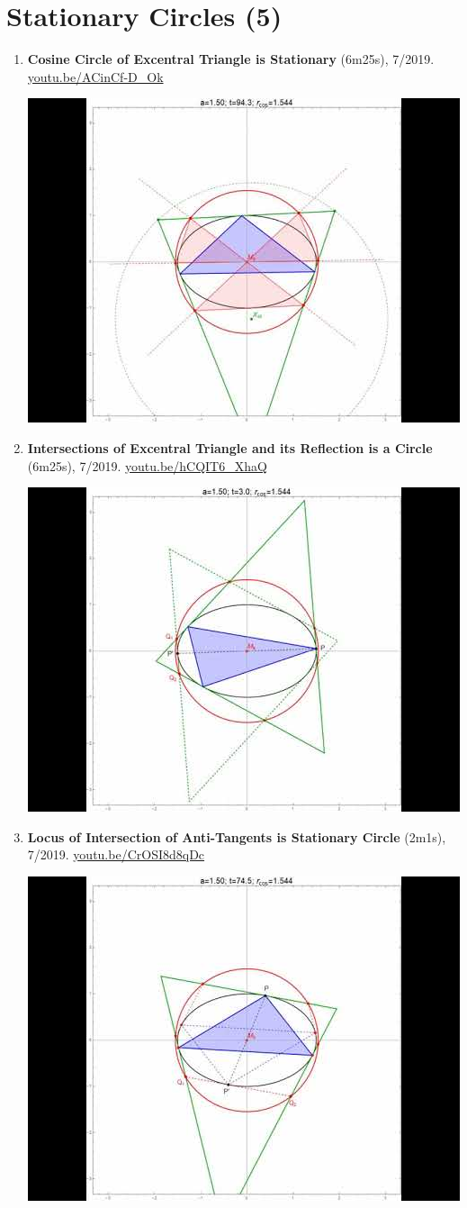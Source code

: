 \documentclass[12pt]{article}
\begin{document}
\section{Stationary Circles (5)}

\begin{enumerate}[resume]
\item \textbf{Cosine Circle of Excentral Triangle is Stationary} (6m25s), 7/2019. \href{https://youtu.be/ACinCf-D_Ok}{\url{youtu.be/ACinCf-D\_Ok}}
\begin{center}\includegraphics[width=.5\textwidth]{pics/ACinCf-D_Ok.jpg}\end{center}
% 
\item \textbf{Intersections of Excentral Triangle and its Reflection is a Circle} (6m25s), 7/2019. \href{https://youtu.be/hCQIT6_XhaQ}{\url{youtu.be/hCQIT6\_XhaQ}}
\begin{center}\includegraphics[width=.5\textwidth]{pics/hCQIT6_XhaQ.jpg}\end{center}
% 
\item \textbf{Locus of Intersection of Anti-Tangents is Stationary Circle} (2m1s), 7/2019. \href{https://youtu.be/CrOSI8d8qDc}{\url{youtu.be/CrOSI8d8qDc}}
\begin{center}\includegraphics[width=.5\textwidth]{pics/CrOSI8d8qDc.jpg}\end{center}

\end{enumerate}
\end{document}
